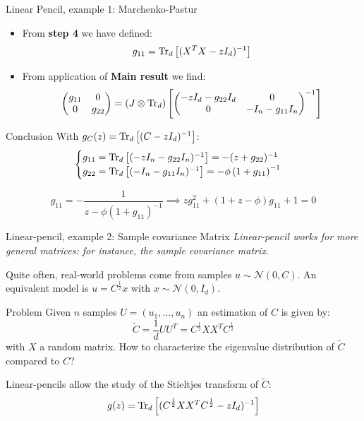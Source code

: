 \documentclass[10pt]{beamer}
\begin{document}
\begin{frame}{Linear Pencil, example 1: Marchenko-Pastur}
  \begin{itemize}
    \item From \textbf{step 4} we have defined:
    \begin{equation}
      g_{11} = \traceLim[d]{ (X^TX - zI_d)^{-1}}
    \end{equation}
    \item From application of \textbf{Main result} we find:
    \begin{equation*}
      \begin{pmatrix}
        g_{11} & 0\\
        0 & g_{22}
      \end{pmatrix}
      = \traceLimOp[d]{
        \begin{pmatrix}
          -zI_d - g_{22} I_d & 0\\
          0 & -I_n - g_{11} I_n
        \end{pmatrix}^{-1}
      }
      \end{equation*}
  \end{itemize}

  \begin{alertblock}{Conclusion}
    With $g_C(z) = \traceLim[d]{ (C - zI_d)^{-1}}$:
    \begin{equation*}
      \begin{cases}
        g_{11} = \traceLim[d]{ (-zI_n - g_{22}I_n)^{-1} } = - (z + g_{22})^{-1}\\
        g_{22} = \traceLim[d]{ (-I_n - g_{11}I_n)^{-1} }
        = - \phi \left( 
          1 + g_{11} 
          \right)^{-1}
      \end{cases}
    \end{equation*}
  \end{alertblock}

  $$
    g_{11} = -\frac{1}{z - \phi (1+g_{11})^{-1}}
    \implies
    z g_{11}^2 + (1+z-\phi) g_{11} +1 = 0
  $$

\end{frame}


\begin{frame}{Linear-pencil, example 2: Sample covariance Matrix}
  \emph{Linear-pencil works for more general matrices: for instance, the sample covariance matrix.}

  Quite often, real-world problems come from samples $u \sim \mathcal N(0, C)$.
  An equivalent model is $u = C^{\frac12}x$ with $x \sim \mathcal N(0, I_d)$.

\begin{block}{Problem}
  Given $n$ samples $U=(u_1, \ldots, u_n)$ an estimation of $C$ is given by:
  $$ \tilde C = \frac{1}{d} UU^T = C^{\frac12} X X^T C^{\frac12}$$ with $X$ a random matrix.
  How to characterize the eigenvalue distribution of $\tilde C$ compared to $C$?
\end{block}

  Linear-pencils allow the study of the Stieltjes transform of $\tilde C$:
  $$
  g(z) =  \traceLim[d]{(C^{\frac12} X X^T C^{\frac12} - zI_d)^{-1} }
  $$
\end{frame}
\end{document}
